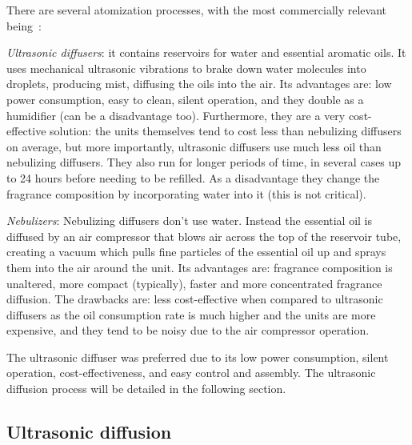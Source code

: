 There are several atomization processes, with the most commercially relevant being~\cite{aromaUltrasonicVsNebul}:
\begin{item-c}
\item \emph{Ultrasonic diffusers}: it contains reservoirs for water and
  essential aromatic oils. It uses mechanical ultrasonic vibrations to
  brake down water molecules into droplets, producing mist, diffusing the oils
  into the air. Its advantages are: low power consumption, easy to clean,
  silent operation, and
  they double as a humidifier (can be a disadvantage too). Furthermore, they are
  a very cost-effective solution: the units themselves tend to cost less than
  nebulizing diffusers on average, but more importantly, ultrasonic diffusers
  use much less oil than nebulizing diffusers. They also run for longer periods
  of time, in several cases up to 24 hours before needing to be refilled.
  As a disadvantage they change the fragrance composition by incorporating water
  into it (this is not critical).
\item \emph{Nebulizers}:
  Nebulizing diffusers don't use water. Instead the essential oil is diffused by
  an air compressor that blows air across the top of the reservoir tube,
  creating a vacuum which pulls fine particles of the essential oil up and
  sprays them into the air around the unit. Its advantages are: fragrance
  composition is unaltered, more compact (typically), faster and more
  concentrated fragrance diffusion. The drawbacks are: less cost-effective when
  compared to ultrasonic diffusers as the oil consumption rate is much higher
  and the units are more expensive, and they tend to be noisy due to the air
  compressor operation.
\end{item-c}

The ultrasonic diffuser was preferred due to its low power consumption, silent
operation, cost-effectiveness, and easy control and assembly. The ultrasonic
diffusion process will be detailed in the following section.

\subsection{Ultrasonic diffusion}
\label{sec:ultrasonic-diffusion}




